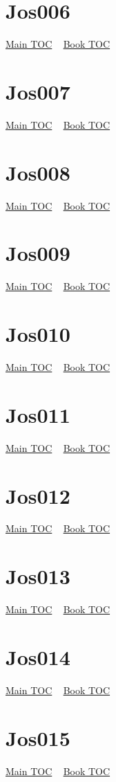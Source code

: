 \documentclass{book}
\begin{document}
  \section{Jos006}\hyperlink{toc}{Main TOC} ~ \hyperref[subsec:Jos]{Book TOC} 
  \section{Jos007}\hyperlink{toc}{Main TOC} ~ \hyperref[subsec:Jos]{Book TOC} 
  \section{Jos008}\hyperlink{toc}{Main TOC} ~ \hyperref[subsec:Jos]{Book TOC} 
  \section{Jos009}\hyperlink{toc}{Main TOC} ~ \hyperref[subsec:Jos]{Book TOC} 
  \section{Jos010}\hyperlink{toc}{Main TOC} ~ \hyperref[subsec:Jos]{Book TOC} 
  \section{Jos011}\hyperlink{toc}{Main TOC} ~ \hyperref[subsec:Jos]{Book TOC} 
  \section{Jos012}\hyperlink{toc}{Main TOC} ~ \hyperref[subsec:Jos]{Book TOC} 
  \section{Jos013}\hyperlink{toc}{Main TOC} ~ \hyperref[subsec:Jos]{Book TOC} 
  \section{Jos014}\hyperlink{toc}{Main TOC} ~ \hyperref[subsec:Jos]{Book TOC} 
  \section{Jos015}\hyperlink{toc}{Main TOC} ~ \hyperref[subsec:Jos]{Book TOC} 
\end{document}
